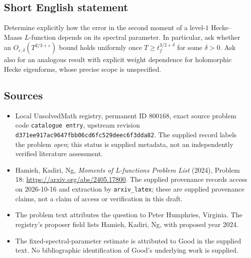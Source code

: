 \documentclass[11pt]{article}
\begin{document}
\subsection{Short English statement}
Determine explicitly how the error in the second moment of a level-\(1\) Hecke--Maass \(L\)-function depends on its spectral parameter. In particular, ask whether an \(O_{\varepsilon,\delta}(T^{2/3+\varepsilon})\) bound holds uniformly once \(T\geq t_f^{3/2+\delta}\) for some \(\delta>0\). Ask also for an analogous result with explicit weight dependence for holomorphic Hecke eigenforms, whose precise scope is unspecified.
\subsection{Sources}
\begin{itemize}
\item Local UnsolvedMath registry, permanent ID \(800168\), exact source problem code \texttt{catalogue entry}, upstream revision \texttt{d371ee917ac9647fbb06cd6fc529deec6f3dda82}. The supplied record labels the problem \emph{open}; this status is supplied metadata, not an independently verified literature assessment.
\item Hamieh, Kadiri, Ng, \emph{Moments of L-functions Problem List} (2024), Problem 18: \url{https://arxiv.org/abs/2405.17800}. The supplied provenance records access on 2026-10-16 and extraction by \texttt{arxiv\_latex}; these are supplied provenance claims, not a claim of access or verification in this draft.
\item The problem text attributes the question to Peter Humphries, Virginia. The registry's proposer field lists Hamieh, Kadiri, Ng, with proposed year 2024.
\item The fixed-spectral-parameter estimate is attributed to Good in the supplied text. No bibliographic identification of Good's underlying work is supplied.
\end{itemize}
\end{document}
